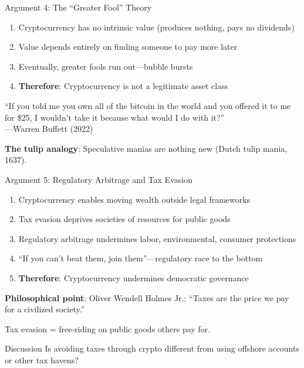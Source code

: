 ﻿\documentclass[aspectratio=169,11pt]{beamer}
\begin{document}
\begin{frame}{Argument 4: The ``Greater Fool'' Theory}
\begin{argumentbox}
\small
\begin{enumerate}
    \item Cryptocurrency has no intrinsic value (produces nothing, pays no dividends)
    \item Value depends entirely on finding someone to pay more later
    \item Eventually, greater fools run out---bubble bursts
    \item \textbf{Therefore}: Cryptocurrency is not a legitimate asset class
\end{enumerate}
\end{argumentbox}

\vspace{0.2em}
\begin{quotebox}
\small
``If you told me you own all of the bitcoin in the world and you offered it to me for \$25, I wouldn't take it because what would I do with it?''\\
\hfill---Warren Buffett (2022)
\end{quotebox}

\textbf{The tulip analogy}: Speculative manias are nothing new (Dutch tulip mania, 1637).
\end{frame}

\begin{frame}{Argument 5: Regulatory Arbitrage and Tax Evasion}
\begin{argumentbox}
\begin{enumerate}
    \item Cryptocurrency enables moving wealth outside legal frameworks
    \item Tax evasion deprives societies of resources for public goods
    \item Regulatory arbitrage undermines labor, environmental, consumer protections
    \item ``If you can't beat them, join them''---regulatory race to the bottom
    \item \textbf{Therefore}: Cryptocurrency undermines democratic governance
\end{enumerate}
\end{argumentbox}

\vspace{0.3em}
\textbf{Philosophical point}: Oliver Wendell Holmes Jr.: ``Taxes are the price we pay for a civilized society.''

Tax evasion = free-riding on public goods others pay for.

\begin{alertblock}{Discussion}
Is avoiding taxes through crypto different from using offshore accounts or other tax havens?
\end{alertblock}
\end{frame}
\end{document}
